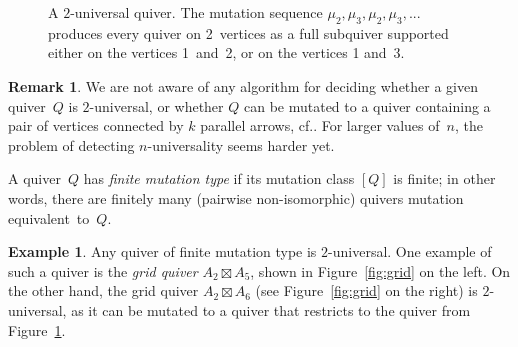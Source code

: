 \documentclass[10pt]{amsart}
\theoremstyle{definition}
\newtheorem{remark}[theorem]{Remark}
\newtheorem{example}[theorem]{Example}
\newcommand{\cf}{cf.}
\begin{document}
\begin{figure}[ht]\centering
{}

\caption{A $2$-universal quiver. The mutation sequence $\mu_2,\mu_3,\mu_2,\mu_3,...$ produces every quiver on 2~vertices as a full subquiver supported either on the vertices 1~and~2, or on the vertices 1 and~3.}\label{fig:2-universal-quiver}
\end{figure}

\begin{remark}
We are not aware of any algorithm for deciding whether a given quiver~$Q$ is $2$-universal, or whether $Q$ can be mutated to a quiver containing a pair of vertices connected by $k$ parallel arrows, \cf \cite[Remark~4.1.13]{FWZ}. For larger values of~$n$, the problem of detecting $n$-universality seems harder yet. 
\end{remark}

A quiver~$Q$ has \emph{finite mutation type} if its mutation class $[Q]$ is finite; in other words, there are finitely many (pairwise non-isomorphic) quivers mutation equivalent~to~$Q$. 

\begin{example}
\label{example:grid-quivers}
Any quiver of finite mutation type is  $2$-universal. One example of such a quiver is the \emph{grid quiver} $A_2\boxtimes A_5$, shown in Figure~\ref{fig:grid} on the left. On the other hand, the grid quiver $A_2\boxtimes A_6$ (see Figure~\ref{fig:grid} on the right) is $2$-universal, as it can be mutated to a quiver that restricts to the quiver from Figure~\ref{fig:2-universal-quiver}. 
\end{example}
\end{document}
